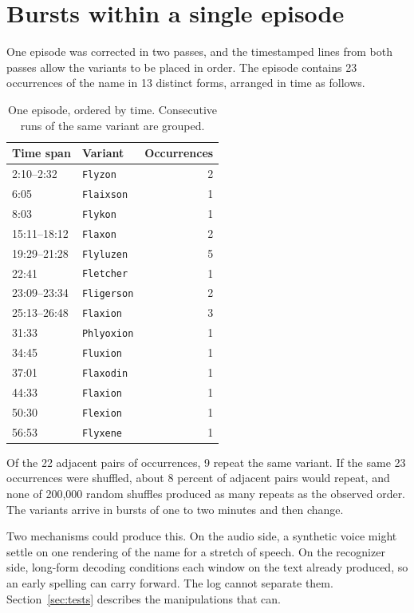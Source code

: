 \documentclass[11pt]{article}
\begin{document}
\section{Bursts within a single episode}

One episode was corrected in two passes, and the timestamped lines from both passes allow the variants to be placed in order. The episode contains 23 occurrences of the name in 13 distinct forms, arranged in time as follows.

\begin{table}[h]
\centering
\begin{tabular}{llr}
\toprule
Time span & Variant & Occurrences \\
\midrule
2:10--2:32 & \texttt{Flyzon} & 2 \\
6:05 & \texttt{Flaixson} & 1 \\
8:03 & \texttt{Flykon} & 1 \\
15:11--18:12 & \texttt{Flaxon} & 2 \\
19:29--21:28 & \texttt{Flyluzen} & 5 \\
22:41 & \texttt{Fletcher} & 1 \\
23:09--23:34 & \texttt{Fligerson} & 2 \\
25:13--26:48 & \texttt{Flaxion} & 3 \\
31:33 & \texttt{Phlyoxion} & 1 \\
34:45 & \texttt{Fluxion} & 1 \\
37:01 & \texttt{Flaxodin} & 1 \\
44:33 & \texttt{Flaxion} & 1 \\
50:30 & \texttt{Flexion} & 1 \\
56:53 & \texttt{Flyxene} & 1 \\
\bottomrule
\end{tabular}
\caption{One episode, ordered by time. Consecutive runs of the same variant are grouped.}
\end{table}

Of the 22 adjacent pairs of occurrences, 9 repeat the same variant. If the same 23 occurrences were shuffled, about 8 percent of adjacent pairs would repeat, and none of 200,000 random shuffles produced as many repeats as the observed order. The variants arrive in bursts of one to two minutes and then change.

Two mechanisms could produce this. On the audio side, a synthetic voice might settle on one rendering of the name for a stretch of speech. On the recognizer side, long-form decoding conditions each window on the text already produced, so an early spelling can carry forward. The log cannot separate them. Section~\ref{sec:tests} describes the manipulations that can.
\end{document}
